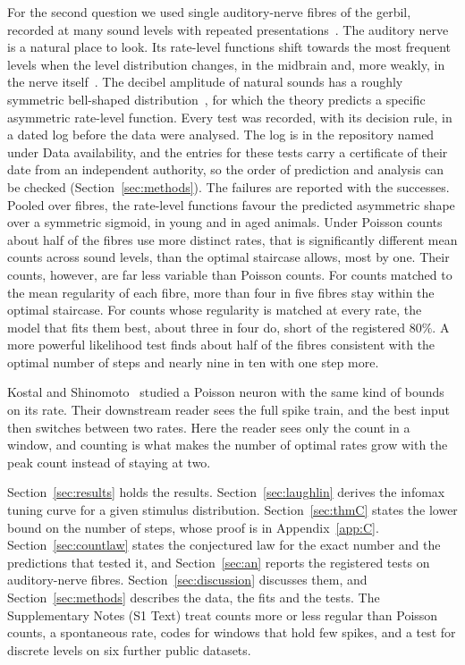 For the second question we used single auditory-nerve fibres of the gerbil, recorded at many sound levels with repeated
presentations~\cite{Heeringa2024}. The auditory nerve is a natural place to look. Its rate-level functions shift towards the most
frequent levels when the level distribution changes, in the midbrain and, more weakly, in the nerve itself~\cite{Wen2009}. The
decibel amplitude of natural sounds has a roughly symmetric bell-shaped distribution~\cite{Escabi2003}, for which the theory predicts a
specific asymmetric rate-level function. Every test was recorded, with its decision rule, in a dated log before the data were analysed.
The log is in the repository named under Data availability, and the entries for these tests carry a certificate of their date
from an independent authority, so the order of prediction and analysis can be checked (Section~\ref{sec:methods}). The failures are
reported with the successes. Pooled over fibres, the rate-level functions favour the predicted asymmetric shape over a symmetric sigmoid, in young and in aged animals.
Under Poisson counts about half of the fibres use more distinct rates, that is significantly different mean counts across sound
levels, than the optimal staircase allows, most by one. Their counts, however, are far less variable than
Poisson counts. For counts matched to the mean regularity of each fibre, more than four in five fibres stay within the optimal
staircase. For counts whose regularity is matched at every rate, the model that fits them best, about three in four do, short of the
registered $80\%$. A more powerful likelihood test finds about half of the fibres consistent with the optimal number of steps and nearly nine in ten
with one step more.

Kostal and Shinomoto~\cite{KostalShinomoto2016} studied a Poisson neuron with the same kind of bounds on its rate. Their downstream
reader sees the full spike train, and the best input then switches between two rates. Here the reader sees only the count in a
window, and counting is what makes the number of optimal rates grow with the peak count instead of staying at two.

Section~\ref{sec:results} holds the results. Section~\ref{sec:laughlin} derives the infomax tuning curve for a given stimulus
distribution. Section~\ref{sec:thmC} states the lower bound on the number of steps, whose proof is in Appendix~\ref{app:C}.
Section~\ref{sec:countlaw} states the conjectured law for the exact number and the predictions that tested it, and Section~\ref{sec:an}
reports the registered tests on auditory-nerve fibres. Section~\ref{sec:discussion} discusses them, and Section~\ref{sec:methods}
describes the data, the fits and the tests. The Supplementary Notes (S1 Text) treat counts more or less regular than Poisson counts, a
spontaneous rate, codes for windows that hold few spikes, and a test for discrete levels on six further public datasets.
